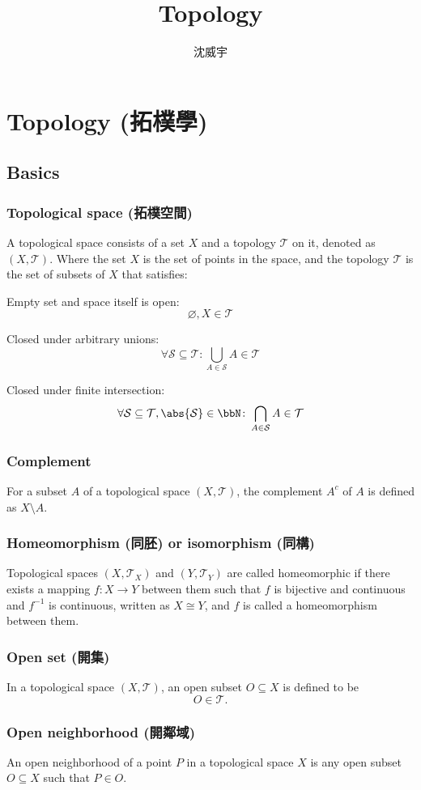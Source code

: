 \documentclass[a4paper,12pt]{article}
\begin{document}
\title{Topology}
\author{沈威宇}
\date{\temtoday}
\titletocdoc
\section{Topology (拓樸學)}
\subsection{Basics}
\subsubsection{Topological space (拓樸空間)}
A topological space consists of a set $X$ and a topology $\mathcal{T}$ on it, denoted as \( (X, \mathcal{T}) \). Where the set \( X \) is the set of points in the space, and the topology \( \mathcal{T} \) is the set of subsets of \( X \) that satisfies:
\bit
\item Empty set and space itself is open:
\[\varnothing,X\in\mathcal{T}\]
\item Closed under arbitrary unions:
\[\forall\mathcal{S}\subseteq\mathcal{T}\colon\bigcup_{A\in\mathcal{S}}A\in\mathcal{T}\]
\item Closed under finite intersection:
\[\forall\mathcal{S}\subseteq\mathcal{T},\abs{\mathcal{S}}\in\bbN\colon\bigcap_{A\in\mathcal{S}}A\in\mathcal{T}\]
\eit
\subsubsection{Complement}
For a subset $A$ of a topological space $(X,\mathcal{T})$, the complement $A^c$ of $A$ is defined as $X\setminus A$.
\subsubsection{Homeomorphism (同胚) or isomorphism (同構)}
Topological spaces $(X,\mathcal{T}_X)$ and $(Y,\mathcal{T}_Y)$ are called homeomorphic if there exists a mapping $f\colon X\to Y$ between them such that $f$ is bijective and continuous and $f^{-1}$ is continuous, written as \( X \cong Y \), and $f$ is called a homeomorphism between them.
\subsubsection{Open set (開集)}
In a topological space \( (X, \mathcal{T}) \), an open subset \( O \subseteq X \) is defined to be
\[O\in \mathcal{T}.\]
\subsubsection{Open neighborhood (開鄰域)}
An open neighborhood of a point $P$ in a topological space $X$ is any open subset $O\subseteq X$ such that $P\in O$.
\end{document}
